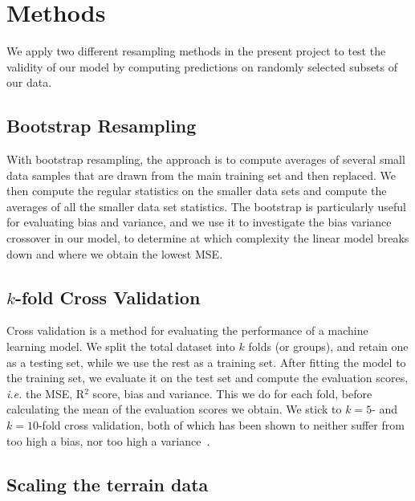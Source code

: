 \documentclass[a4paper, 
amsfonts, 
amssymb, 
amsmath, 
reprint, 
showkeys, 
nofootinbib, 
twoside]{revtex4-2}
\begin{document}
\section{Methods}
\label{methods}

We apply two different resampling methods in the present project to test the validity of our model by computing predictions on randomly selected subsets of our data. 

\subsection{Bootstrap Resampling}
With bootstrap resampling, the approach is to compute averages of several small data samples that are drawn from the main training set and then replaced. We then compute the regular statistics on the smaller data sets and compute the averages of all the smaller data set statistics. The bootstrap is particularly useful for evaluating bias and variance, and we use it to investigate the bias variance crossover in our model, to determine at which complexity the linear model breaks down and where we obtain the lowest MSE.

\subsection{$k$-fold Cross Validation}

Cross validation is a method for evaluating the performance of a machine learning model. We split the total dataset into $k$ folds (or groups), and retain one as a testing set, while we use the rest as a training set. After fitting the model to the training set, we evaluate it on the test set and compute the evaluation scores, \textit{i.e.} the MSE, R$^2$ score, bias and variance. This we do for each fold, before calculating the mean of the evaluation scores we obtain.
We stick to $k = 5$- and $k = 10$-fold cross validation, both of which has been shown to neither suffer from too high a bias, nor too high a variance~\cite{James}.

\subsection{Scaling the terrain data}
\end{document}
